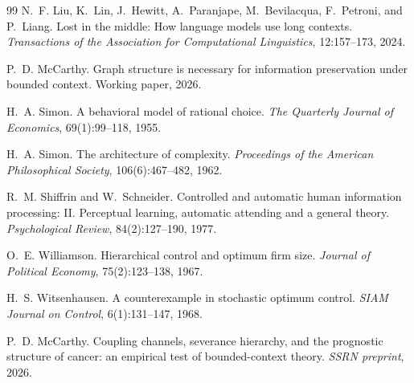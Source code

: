 \documentclass[11pt]{article}
\theoremstyle{definition}
\begin{document}
\begin{thebibliography}{99}
N.~F. Liu, K.~Lin, J.~Hewitt, A.~Paranjape, M.~Bevilacqua, F.~Petroni, and
  P.~Liang.
\newblock Lost in the middle: How language models use long contexts.
\newblock \emph{Transactions of the Association for Computational Linguistics},
  12:157--173, 2024.

P.~D. McCarthy.
\newblock Graph structure is necessary for information preservation under
  bounded context.
\newblock Working paper, 2026.

H.~A. Simon.
\newblock A behavioral model of rational choice.
\newblock \emph{The Quarterly Journal of Economics}, 69(1):99--118, 1955.

H.~A. Simon.
\newblock The architecture of complexity.
\newblock \emph{Proceedings of the American Philosophical Society},
  106(6):467--482, 1962.

R.~M. Shiffrin and W.~Schneider.
\newblock Controlled and automatic human information processing: {II}.
  Perceptual learning, automatic attending and a general theory.
\newblock \emph{Psychological Review}, 84(2):127--190, 1977.

O.~E. Williamson.
\newblock Hierarchical control and optimum firm size.
\newblock \emph{Journal of Political Economy}, 75(2):123--138, 1967.

H.~S. Witsenhausen.
\newblock A counterexample in stochastic optimum control.
\newblock \emph{SIAM Journal on Control}, 6(1):131--147, 1968.

P.~D. McCarthy.
\newblock Coupling channels, severance hierarchy, and the prognostic
structure of cancer: an empirical test of bounded-context theory.
\newblock \emph{SSRN preprint}, 2026.

\end{thebibliography}
\end{document}
